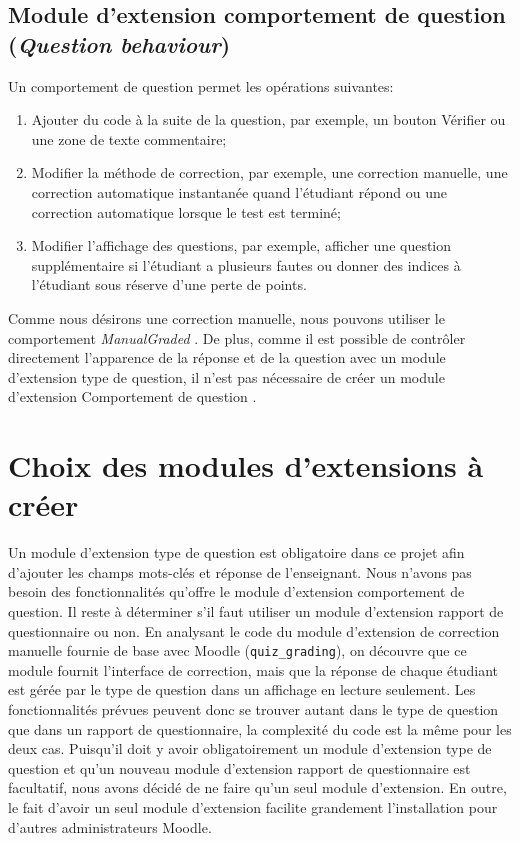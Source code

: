 \subsection{Module d'extension comportement de question (\textit{Question behaviour})}
Un comportement de question permet les op\'erations suivantes:
\begin{enumerate}
  \item Ajouter du code \`a la suite de la question, par exemple, un bouton \og V\'erifier \fg{} ou une zone de texte commentaire;
  
  \item Modifier la m\'ethode de correction, par exemple, une correction manuelle, une correction automatique instantan\'ee quand l'\'etudiant r\'epond ou une correction automatique lorsque le test est termin\'e;
  
  \item Modifier l'affichage des questions, par exemple, afficher une question suppl\'ementaire si l'\'etudiant a plusieurs fautes ou donner des indices \`a l'\'etudiant sous r\'eserve d'une perte de points.
\end{enumerate}
Comme nous d\'esirons une correction manuelle, nous pouvons utiliser le comportement \og \emph{ManualGraded} \fg{}.
De plus, comme il est possible de contr\^oler directement l'apparence de la r\'eponse et de la question avec un module d'extension type de question, il n'est pas n\'ecessaire de cr\'eer un module d'extension \og Comportement de question \fg{}.

\section{Choix des modules d'extensions \`a cr\'eer}
Un module d'extension type de question est obligatoire dans ce projet afin d'ajouter les champs mots-cl\'es et r\'eponse de l'enseignant.
Nous n'avons pas besoin des fonctionnalit\'es qu'offre le module d'extension comportement de question.
Il reste \`a d\'eterminer s'il faut utiliser un module d'extension rapport de questionnaire ou non.
En analysant le code du module d'extension de correction manuelle fournie de base avec Moodle (\texttt{quiz\_grading}), on d\'ecouvre que ce module fournit l'interface de correction, mais que la r\'eponse de chaque \'etudiant est g\'er\'ee par le type de question dans un affichage en lecture seulement.
Les fonctionnalit\'es pr\'evues peuvent donc se trouver autant dans le type de question que dans un rapport de questionnaire, la complexit\'e du code est la m\^eme pour les deux cas.
Puisqu'il doit y avoir obligatoirement un module d'extension type de question et qu'un nouveau module d'extension rapport de questionnaire est facultatif, nous avons d\'ecid\'e de ne faire qu'un seul module d'extension.
En outre, le fait d'avoir un seul module d'extension facilite grandement l'installation pour d'autres administrateurs Moodle.
